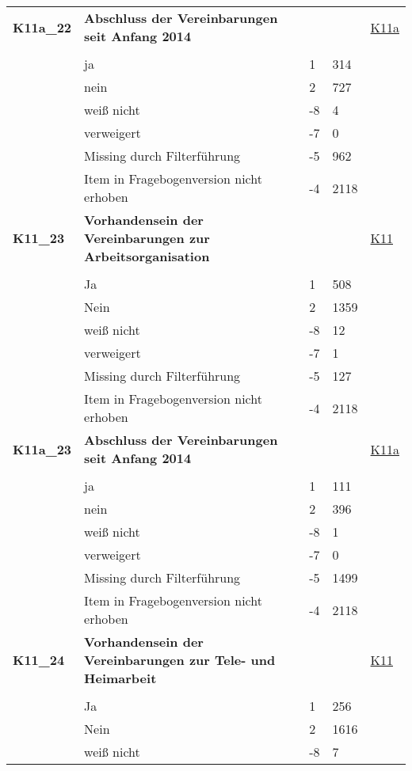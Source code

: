 \begin{longtable}{| L{2.5cm} | L{8.25cm}| C{1.5cm} | R{1.25cm} | C{2.25cm} |  }
   \midrule
\textbf{K11a\_22}\label{var:suf:K11a:22} & \textbf{Abschluss der Vereinbarungen seit Anfang 2014} &  &  & \hyperref[K11a]{K11a} \\ 
   &  &  &  &  \\ 
   & ja & 1 & 314 &  \\ 
   & nein & 2 & 727 &  \\ 
   & weiß nicht & -8 & 4 &  \\ 
   & verweigert & -7 & 0 &  \\ 
   & Missing durch Filterführung & -5 & 962 &  \\ 
   & Item in Fragebogenversion nicht erhoben & -4 & 2118 &  \\ 
   \midrule
\textbf{K11\_23}\label{var:suf:K11:23} & \textbf{Vorhandensein der Vereinbarungen zur Arbeitsorganisation} &  &  & \hyperref[K11]{K11} \\ 
   &  &  &  &  \\ 
   & Ja & 1 & 508 &  \\ 
   & Nein & 2 & 1359 &  \\ 
   & weiß nicht & -8 & 12 &  \\ 
   & verweigert & -7 & 1 &  \\ 
   & Missing durch Filterführung & -5 & 127 &  \\ 
   & Item in Fragebogenversion nicht erhoben & -4 & 2118 &  \\ 
   \midrule
\textbf{K11a\_23}\label{var:suf:K11a:23} & \textbf{Abschluss der Vereinbarungen seit Anfang 2014} &  &  & \hyperref[K11a]{K11a} \\ 
   &  &  &  &  \\ 
   & ja & 1 & 111 &  \\ 
   & nein & 2 & 396 &  \\ 
   & weiß nicht & -8 & 1 &  \\ 
   & verweigert & -7 & 0 &  \\ 
   & Missing durch Filterführung & -5 & 1499 &  \\ 
   & Item in Fragebogenversion nicht erhoben & -4 & 2118 &  \\ 
   \midrule
\textbf{K11\_24}\label{var:suf:K11:24} & \textbf{Vorhandensein der Vereinbarungen zur Tele- und Heimarbeit} &  &  & \hyperref[K11]{K11} \\ 
   &  &  &  &  \\ 
   & Ja & 1 & 256 &  \\ 
   & Nein & 2 & 1616 &  \\ 
   & weiß nicht & -8 & 7 &  \\ 

\end{longtable}
